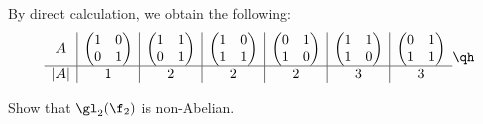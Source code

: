 \begin{sol}
    By direct calculation, we obtain the following:
    \[
    \begin{array}{c|c|c|c|c|c|c}
        A & 
        \begin{pmatrix}
            1 & 0 \\
            0 & 1
        \end{pmatrix} & 
        \begin{pmatrix}
            1 & 1 \\
            0 & 1
        \end{pmatrix} &
        \begin{pmatrix}
            1 & 0 \\
            1 & 1
        \end{pmatrix} &
        \begin{pmatrix}
            0 & 1 \\
            1 & 0
        \end{pmatrix} &
        \begin{pmatrix}
            1 & 1 \\
            1 & 0
        \end{pmatrix} &
        \begin{pmatrix}
            0 & 1 \\
            1 & 1
        \end{pmatrix} \\
        \hline
        |A| & 1 & 2 & 2 & 2 & 3 & 3
    \end{array} \qh
    \]
\end{sol}

\begin{exercise} \label{ex1.4.3}
    Show that $\gl_2(\f_2)$ is non-Abelian.
\end{exercise}

